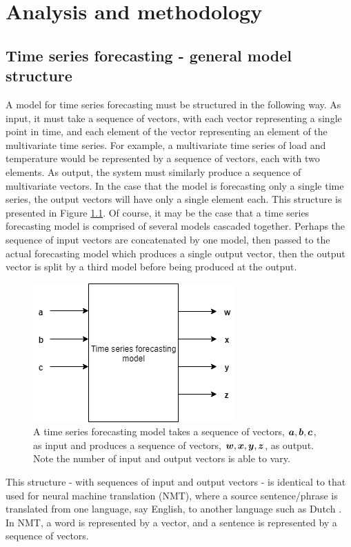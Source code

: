 \chapter{Analysis and methodology}
\label{ana-meth}

\section{Time series forecasting - general model structure}
A model for time series forecasting must be structured in the following way.
As input, it must take a sequence of vectors, with each vector representing a single point in time, and each element of the vector representing an element of the multivariate time series.
For example, a multivariate time series of load and temperature would be represented by a sequence of vectors, each with two elements.
As output, the system must similarly produce a sequence of multivariate vectors.
In the case that the model is forecasting only a single time series, the output vectors will have only a single element each.
This structure is presented in Figure \ref{fig:forecast-model}.
Of course, it may be the case that a time series forecasting model is comprised of several models cascaded together.
Perhaps the sequence of input vectors are concatenated by one model, then passed to the actual forecasting model which produces a single output vector, then the output vector is split by a third model before being produced at the output.

\begin{figure}
	\centering
	\includegraphics[width=0.35\linewidth]{images/forecast-model}
	\caption{A time series forecasting model takes a sequence of vectors, ${\bm{a}}, {\bm{b}}, {\bm{c}}$, as input and produces a sequence of vectors, ${\bm{w}}, {\bm{x}}, {\bm{y}}, {\bm{z}}$, as output. Note the number of input and output vectors is able to vary.}
	\label{fig:forecast-model}
\end{figure}

This structure - with sequences of input and output vectors - is identical to that used for neural machine translation (NMT), where a source sentence/phrase is translated from one language, say English, to another language such as Dutch \citep{Cho2014}.
In NMT, a word is represented by a vector, and a sentence is represented by a sequence of vectors.

